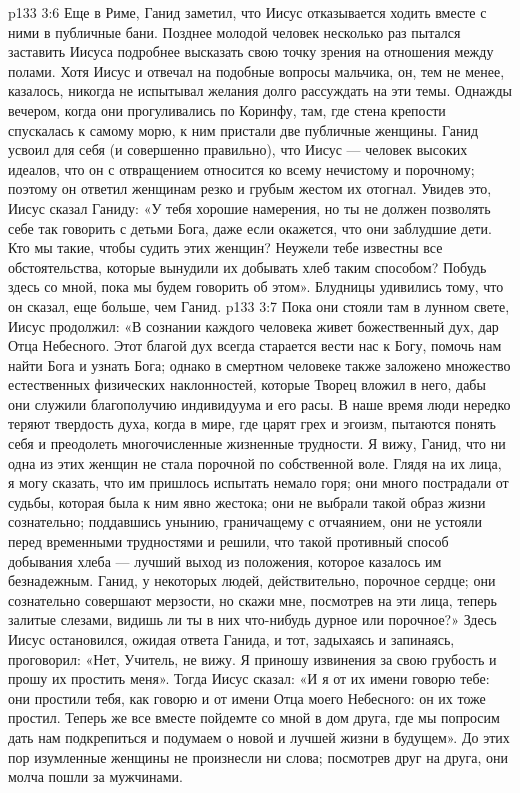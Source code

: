 \vs p133 3:6 Еще в Риме, Ганид заметил, что Иисус отказывается ходить вместе с ними в публичные бани. Позднее молодой человек несколько раз пытался заставить Иисуса подробнее высказать свою точку зрения на отношения между полами. Хотя Иисус и отвечал на подобные вопросы мальчика, он, тем не менее, казалось, никогда не испытывал желания долго рассуждать на эти темы. Однажды вечером, когда они прогуливались по Коринфу, там, где стена крепости спускалась к самому морю, к ним пристали две публичные женщины. Ганид усвоил для себя (и совершенно правильно), что Иисус --- человек высоких идеалов, что он с отвращением относится ко всему нечистому и порочному; поэтому он ответил женщинам резко и грубым жестом их отогнал. Увидев это, Иисус сказал Ганиду: «У тебя хорошие намерения, но ты не должен позволять себе так говорить с детьми Бога, даже если окажется, что они заблудшие дети. Кто мы такие, чтобы судить этих женщин? Неужели тебе известны все обстоятельства, которые вынудили их добывать хлеб таким способом? Побудь здесь со мной, пока мы будем говорить об этом». Блудницы удивились тому, что он сказал, еще больше, чем Ганид.
\vs p133 3:7 Пока они стояли там в лунном свете, Иисус продолжил: «В сознании каждого человека живет божественный дух, дар Отца Небесного. Этот благой дух всегда старается вести нас к Богу, помочь нам найти Бога и узнать Бога; однако в смертном человеке также заложено множество естественных физических наклонностей, которые Творец вложил в него, дабы они служили благополучию индивидуума и его расы. В наше время люди нередко теряют твердость духа, когда в мире, где царят грех и эгоизм, пытаются понять себя и преодолеть многочисленные жизненные трудности. Я вижу, Ганид, что ни одна из этих женщин не стала порочной по собственной воле. Глядя на их лица, я могу сказать, что им пришлось испытать немало горя; они много пострадали от судьбы, которая была к ним явно жестока; они не выбрали такой образ жизни сознательно; поддавшись унынию, граничащему с отчаянием, они не устояли перед временными трудностями и решили, что такой противный способ добывания хлеба --- лучший выход из положения, которое казалось им безнадежным. Ганид, у некоторых людей, действительно, порочное сердце; они сознательно совершают мерзости, но скажи мне, посмотрев на эти лица, теперь залитые слезами, видишь ли ты в них что\hyp{}нибудь дурное или порочное?» Здесь Иисус остановился, ожидая ответа Ганида, и тот, задыхаясь и запинаясь, проговорил: «Нет, Учитель, не вижу. Я приношу извинения за свою грубость и прошу их простить меня». Тогда Иисус сказал: «И я от их имени говорю тебе: они простили тебя, как говорю и от имени Отца моего Небесного: он их тоже простил. Теперь же все вместе пойдемте со мной в дом друга, где мы попросим дать нам подкрепиться и подумаем о новой и лучшей жизни в будущем». До этих пор изумленные женщины не произнесли ни слова; посмотрев друг на друга, они молча пошли за мужчинами.
